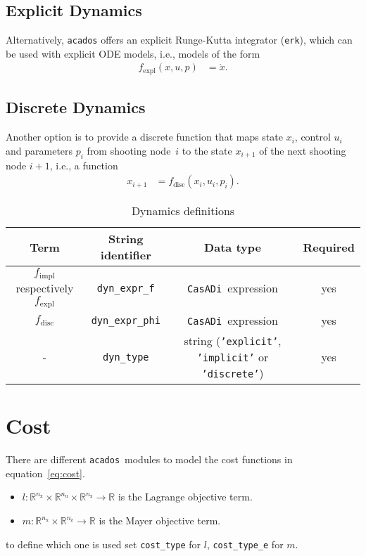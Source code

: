 \documentclass[english]{article}
\newcommand{\code}[1]{\texttt{#1}}
\newcommand{\str}[1]{\texttt{'#1'}}
\newcommand{\casadi}{\texttt{CasADi}}
\newcommand{\acados}{\texttt{acados}}
\newcommand{\ind}[1]{_{\textrm{#1}}}
\newcommand{\nx}{n\ind{x}}
\newcommand{\nuu}{n\ind{u}}
\newcommand{\nz}{n\ind{z}}
\newcommand{\mandatory}{yes}
\begin{document}
\subsection{Explicit Dynamics}\label{sec:dynamics:explicit}
%
Alternatively, \acados{} offers an explicit Runge-Kutta integrator (\code{erk}), which can be used with explicit ODE models, i.e., models of the form
\begin{align}
f\ind{expl}(x,u,p) &= \dot{x}.\label{eq:dynamics:explicit}
\end{align}
%
\subsection{Discrete Dynamics}\label{sec:dynamics:discrete}
%
Another option is to provide a discrete function that maps state $x_i$, control $u_i$ and parameters $p_i$ from shooting node~$i$ to the state $x_{i+1}$ of the next shooting node $i+1$, i.e., a function
\begin{align}
x_{i+1} &= f\ind{disc}(x_i,u_i,p_i).\label{eq:dynamics:discrete}
\end{align}
%
\begin{table}[ht!]
    \centering
    \caption{Dynamics definitions} \label{tab:dynamics}
    \begin{tabular}{cccc}
        \toprule
        Term & String identifier & Data type & Required \\ \midrule
        $ f\ind{impl} $ respectively $ f\ind{expl} $ & \code{dyn\_expr\_f}    & \casadi~expression & \mandatory \\
        $f\ind{disc}$ & \code{dyn\_expr\_phi} & \casadi~expression & \mandatory \\
        - & \code{dyn\_type}    & string (\str{explicit}, \str{implicit} or \str{discrete}) & \mandatory \\
        \bottomrule
    \end{tabular}
\end{table}
%
\section{Cost}\label{sec:cost}
%
There are different \acados~modules to model the cost functions in equation~\eqref{eq:cost}.
\begin{itemize}
\item $ l: \mathbb{R}^{\nx}\times\mathbb{R}^{\nuu}\times\mathbb{R}^{\nz} \rightarrow \mathbb{R}$ is the Lagrange objective term.
\item $ m: \mathbb{R}^{\nx}\times\mathbb{R}^{\nz} \rightarrow \mathbb{R} $ is the Mayer objective term.
\end{itemize}
to define which one is used set \code{cost\_type} for $l$, \code{cost\_type\_e} for $m$.
\end{document}
